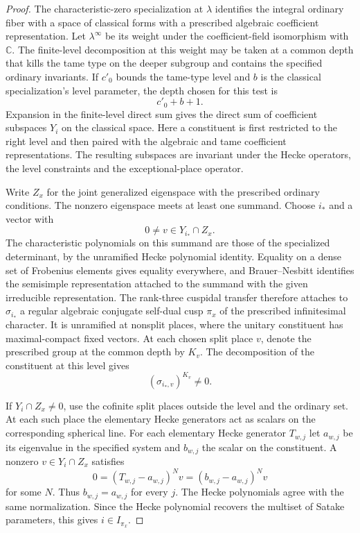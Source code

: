 \begin{proof}
The characteristic-zero specialization at \(\lambda\)
identifies the integral ordinary fiber with a space of
classical forms with a prescribed algebraic coefficient
representation. Let \(\lambda^\infty\) be its weight
under the coefficient-field isomorphism with
\(\mathbb C\). The finite-level decomposition at this
weight may be taken at a common depth that kills the
tame type on the deeper subgroup and contains the
specified ordinary invariants. If \(c'_0\) bounds the tame-type level and \(b\) is the classical specialization's level parameter, the depth chosen for this test is
\[
 c'_0+b+1 .
\] Expansion in the
finite-level direct sum gives the direct sum of
coefficient subspaces \(Y_i\) on the classical
space. Here a constituent is first restricted to the
right level and then paired with the algebraic and
tame coefficient representations. The resulting
subspaces are invariant under the Hecke operators,
the level constraints and the exceptional-place
operator.

Write \(Z_x\) for the joint generalized eigenspace
with the prescribed ordinary conditions. The nonzero eigenspace meets at least one summand. Choose \(i_*\) and a vector with
\[
 0\ne v\in Y_{i_*}\cap Z_x .
\] The characteristic
polynomials on this summand are those of the
specialized determinant, by the unramified Hecke
polynomial identity. Equality on a dense set of
Frobenius elements gives equality everywhere,
and Brauer--Nesbitt identifies the semisimple
representation attached to the summand with the
given irreducible representation. The rank-three cuspidal transfer therefore attaches
to \(\sigma_{i_*}\) a regular algebraic conjugate
self-dual cusp \(\pi_x\) of the prescribed
infinitesimal character. It is unramified at
nonsplit places, where the unitary constituent
has maximal-compact fixed vectors. At each chosen split place \(v\), denote the prescribed group at the common depth by \(K_v\). The decomposition of the constituent at this level gives
\[
 (\sigma_{i_*,v})^{K_v}\ne0 .
\]

If \(Y_i\cap Z_x\ne0\), use the cofinite split
places outside the level and the ordinary set.
At each such place the elementary Hecke generators
act as scalars on the corresponding spherical
line. For each elementary Hecke generator \(T_{w,j}\) let
\(a_{w,j}\) be its eigenvalue in the specified system and
\(b_{w,j}\) the scalar on the constituent. A nonzero
\(v\in Y_i\cap Z_x\) satisfies
\[
 0=(T_{w,j}-a_{w,j})^N v=(b_{w,j}-a_{w,j})^N v
\]
for some \(N\). Thus \(b_{w,j}=a_{w,j}\) for every \(j\).
The Hecke polynomials agree with the same normalization.
Since the Hecke polynomial recovers the multiset
of Satake parameters, this gives \(i\in I_{\pi_x}\).


\end{proof}
